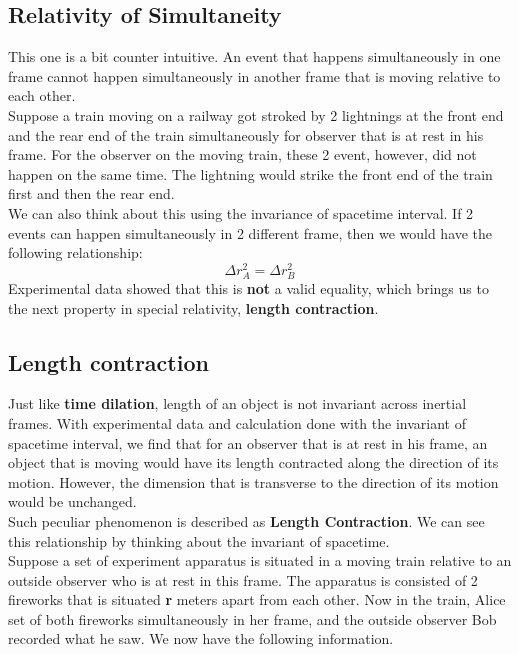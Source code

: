 \documentclass[12pt]{book}
\begin{document}
\subsection{Relativity of Simultaneity}
This one is a bit counter intuitive. An event that happens simultaneously in one frame cannot happen simultaneously in another frame that is moving relative to each other. \\
\newline 
Suppose a train moving on a railway got stroked by 2 lightnings at the front end and the rear end of the train simultaneously for observer that is at rest in his frame. For the observer on the moving train, these 2 event, however, did not happen on the same time. The lightning would strike the front end of the train first and then the rear end. 
\\
\newline
We can also think about this using the invariance of spacetime interval. If 2 events can happen simultaneously in 2 different frame, then we would have the following relationship:
\[
\Delta r_A^2 = \Delta r_B^2
\]
Experimental data showed that this is \textbf{not} a valid equality, which brings us to the next property in special relativity, \textbf{length contraction}.
\subsection{Length contraction}
Just like \textbf{time dilation}, length of an object is not invariant across inertial frames. With experimental data and calculation done with the invariant of spacetime interval, we find that for an observer that is at rest in his frame, an object that is moving would have its length contracted along the direction of its motion. However, the dimension that is transverse to the direction of its motion would be unchanged. \\
\newline
Such peculiar phenomenon is described as \textbf{Length Contraction}. We can see this relationship by thinking about the invariant of spacetime. \\
\newline
Suppose a set of experiment apparatus is situated in a moving train relative to an outside observer who is at rest in this frame. The apparatus is consisted of 2 fireworks that is situated \textbf{r} meters apart from each other. Now in the train, Alice set of both fireworks simultaneously in her frame, and the outside observer Bob recorded what he saw. We now have the following information.
\\
\newline
\end{document}
